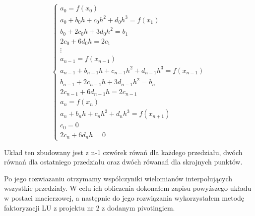 \documentclass[fleqn]{article}
\begin{document}
    \[
    \begin{cases}
        a_0 = f(x_0)\\
        a_0 + b_0h + c_0h^2 + d_0h^3 = f(x_1)\\
        b_0 + 2c_0h + 3d_0h^2 = b_1\\
        2c_0 + 6d_0h = 2c_1\\
        \vdots \\
        a_{n-1} = f(x_{n-1})\\
        a_{n-1} + b_{n-1}h + c_{n-1}h^2 + d_{n-1}h^3 = f(x_{n-1})\\
        b_{n-1} + 2c_{n-1}h + 3d_{n-1}h^2 = b_{n}\\
        2c_{n-1} + 6d_{n-1}h = 2c_{n-1}\\
        a_n = f(x_n) \\
        a_n + b_nh + c_nh^2 + d_nh^3 = f(x_{n+1})\\
        c_0 = 0 \\
        2c_n + 6d_nh = 0
    \end{cases}    
    \]

    \noindent Układ ten zbudowany jest z n-1 czwórek rówań dla każdego przedziału, dwóch równań dla ostatniego przedziału
    oraz dwóch rówanań dla skrajnych punktów.

    \noindent Po jego rozwiazaniu otrzymamy współczyniki wielomianów interpolujących wszystkie przedziały. W celu ich obliczenia dokonałem
    zapisu powyższego układu w postaci macierzowej, a następnie do jego rozwiązania wykorzystałem metodę faktoryzacji LU z projektu nr 2 z dodanym pivotingiem.

    \newpage
\end{document}
